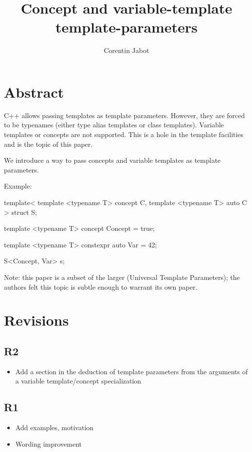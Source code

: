 \documentclass{wg21}
\title{Concept and variable-template template-parameters}
\author{Corentin Jabot}{corentin.jabot@gmail.com}
\begin{document}
\maketitle

\section{Abstract}

C++ allows passing templates as template parameters.
However, they are forced to be typenames (either type alias templates or class templates).
Variable templates or concepts are not supported.
This is a hole in the template facilities and is the topic of this paper.

We introduce a way to pass concepts and variable templates as template parameters.

Example:

\begin{colorblock}
template<
   template <typename T> concept C,
   template <typename T> auto C
>
struct S{};

template <typename T>
concept Concept = true;

template <typename T>
constexpr auto Var = 42;

S<Concept, Var> s;
\end{colorblock}

Note: this paper is a subset of the larger  (Universal Template Parameters); the authors felt this topic is subtle enough to warrant its own paper.

\section{Revisions}

\subsection{R2}

\begin{itemize}
\item Add a section in the deduction of template parameters from the arguments of a variable template/concept specialization
\end{itemize}


\subsection{R1}

\begin{itemize}
\item Add examples, motivation
\item Wording improvement
\end{itemize}
\end{document}
